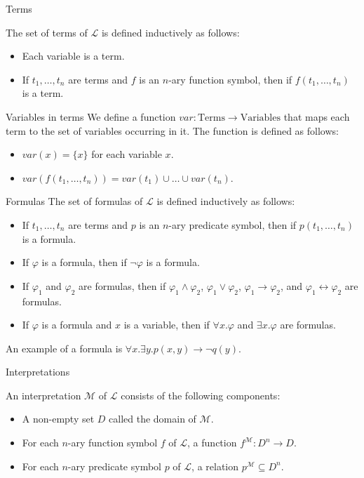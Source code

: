 \documentclass{beamer}
\begin{document}
  \begin{frame}{Terms}

    The set of terms of $\mathscr{L}$ is defined inductively as follows:
    \begin{itemize}
    \item Each variable is a term.
    \item If $t_1, \ldots, t_n$ are terms and $f$ is an $n$-ary function symbol, then if $f(t_1, \ldots, t_n)$ is a term.
  \end{itemize}
  \end{frame}

  \begin{frame}{Variables in terms}
    We define a function $var: \text{Terms}\rightarrow\text{Variables}$ that maps each term to the set of variables occurring in it. The function is defined as follows:
    \begin{itemize}
    \item $var(x) = \{x\}$ for each variable $x$.
    \item $var(f(t_1, \ldots, t_n)) = var(t_1)\cup\ldots\cup var(t_n)$.
  \end{itemize}
  \end{frame}
  \begin{frame}{Formulas}
    The set of formulas of $\mathscr{L}$ is defined inductively as follows:
    \begin{itemize}
    \item If $t_1, \ldots, t_n$ are terms and $p$ is an $n$-ary predicate symbol, then if $p(t_1, \ldots, t_n)$ is a formula.
    \item If $\varphi$ is a formula, then if $\neg\varphi$ is a formula.
    \item If $\varphi_1$ and $\varphi_2$ are formulas, then if $\varphi_1\wedge\varphi_2$, $\varphi_1\vee\varphi_2$, $\varphi_1\rightarrow\varphi_2$, and $\varphi_1\leftrightarrow\varphi_2$ are formulas.
    \item If $\varphi$ is a formula and $x$ is a variable, then if $\forall x.\varphi$ and $\exists x.\varphi$ are formulas.
  \end{itemize}
  An example of a formula is $\forall x. \exists y. p(x, y) \rightarrow \neg q(y)$.
  \end{frame}

  \begin{frame}{Interpretations}
    
    An interpretation $\mathcal{M}$ of $\mathscr{L}$ consists of the following components:
    \begin{itemize}
    \item A non-empty set $D$ called the domain of $\mathcal{M}$.
    \item For each $n$-ary function symbol $f$ of $\mathscr{L}$, a function $f^{\mathcal{M}}: D^n\rightarrow D$.
    \item For each $n$-ary predicate symbol $p$ of $\mathscr{L}$, a relation $p^{\mathcal{M}}\subseteq D^n$.
  \end{itemize}
  \end{frame}
\end{document}
